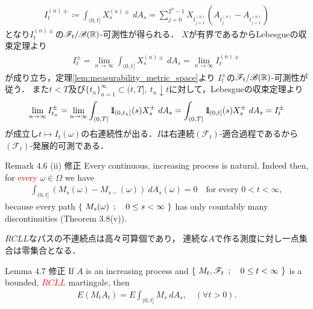 \begin{prf}
\begin{align}
			I^{(n)\pm}_t \coloneqq \int_{(0,t]} X^{(n)\pm}_s\ dA_s
			= \sum_{j=0}^{2^n-1} X_{t^{(n)}_{j+1}} \left(A_{t^{(n)}_j} - A_{t^{(n)}_{j+1}}\right)
		\end{align}
		となり$I^{(n)\pm}_t$の$\mathscr{F}_t/\mathscr{B}(\mathbb{R})$-可測性が得られる．
		$X$が有界であるからLebesgueの収束定理より
		\begin{align}
			I^{\pm}_t = \lim_{n \to \infty} \int_{(0,t]} X^{(n)\pm}_s\ dA_s
			= \lim_{n \to \infty} I^{(n)\pm}_t
		\end{align}
		が成り立ち，定理\ref{lem:measurability_metric_space}より
		$I^{\pm}_t$の$\mathscr{F}_t/\mathscr{B}(\mathbb{R})$-可測性が従う．
		また$t<T$及び$\{t_n\}_{n=1}^\infty \subset (t,T],\ t_n \downarrow t$に対して，Lebesgueの収束定理より
		\begin{align}
			\lim_{n \to \infty} I^\pm_{t_n}
			= \lim_{n \to \infty} \int_{(0,T]} \mbox{1}\hspace{-0.25em}\mbox{l}_{(0,t_n]}(s)X^\pm_s\ dA_s
			= \int_{(0,T]} \mbox{1}\hspace{-0.25em}\mbox{l}_{(0,t]}(s)X^\pm_s\ dA_s
			= I^\pm_t
		\end{align}
		が成立し$t \longmapsto I_t(\omega)$の右連続性が出る．$I$は右連続$(\mathscr{F}_t)$-適合過程であるから
		$(\mathscr{F}_t)$-発展的可測である．
		\QED
	\end{prf}
	
	\begin{itembox}[l]{Remark 4.6 (ii) 修正}
		Every continuous, increasing process is natural. Indeed then, for \textcolor{red}{every} $\omega \in \Omega$
		we have
		\begin{align}
			\int_{(0,t]} (M_s(\omega)-M_{s-}(\omega))\ dA_s(\omega) = 0
			\quad \mbox{for every $0 < t < \infty$},
		\end{align}
		because every path $\left\{\ M_s(\omega)\ \, ; \quad 0 \leq s < \infty\ \right\}$ has only countably many discontinuities
		(Theorem 3.8(v)).
	\end{itembox}
	
	\begin{prf}
		$RCLL$なパスの不連続点は高々可算個であり，
		連続な$A$で作る測度に対し一点集合は零集合となる．
		\QED
	\end{prf}
	
	\begin{itembox}[l]{Lemma 4.7 修正}
		If $A$ is an increasing process and $\left\{\ M_t,\mathscr{F}_t\ \, ; \quad 0 \leq t < \infty\ \right\}$ is a bounded,
		\textcolor{red}{$RCLL$} martingale, then
		\begin{align}
			E(M_t A_t) = E \int_{(0,t]} M_s\ dA_s, \quad (\forall t > 0).
			\label{eq:chapter_1_lemma_4_7}
		\end{align}
	\end{itembox}
	
